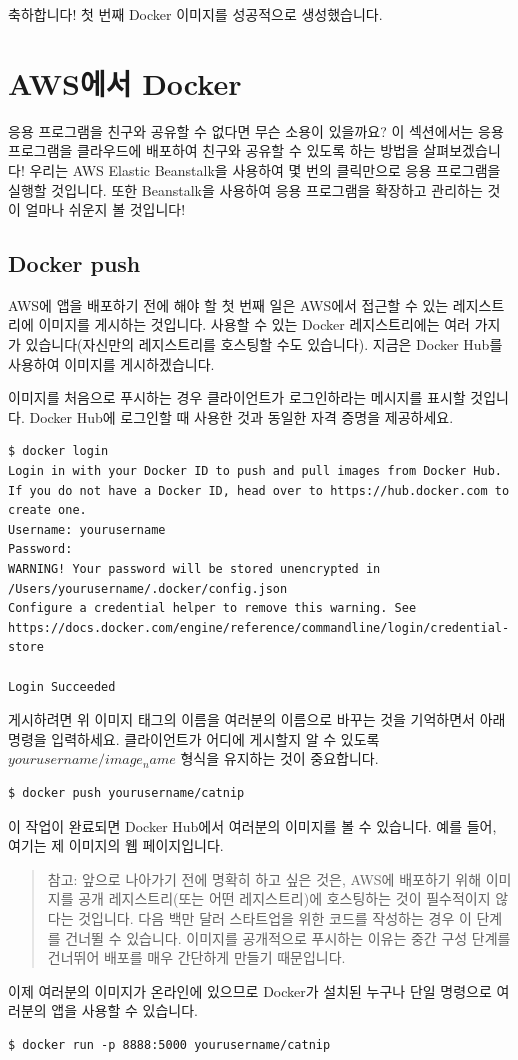 축하합니다! 첫 번째 Docker 이미지를 성공적으로 생성했습니다.

\section{AWS에서 Docker}
응용 프로그램을 친구와 공유할 수 없다면 무슨 소용이 있을까요? 이 섹션에서는 응용 프로그램을 클라우드에 배포하여 친구와 공유할 수 있도록 하는 방법을 살펴보겠습니다! 우리는 AWS Elastic Beanstalk을 사용하여 몇 번의 클릭만으로 응용 프로그램을 실행할 것입니다. 또한 Beanstalk을 사용하여 응용 프로그램을 확장하고 관리하는 것이 얼마나 쉬운지 볼 것입니다!

\subsection{Docker push}
AWS에 앱을 배포하기 전에 해야 할 첫 번째 일은 AWS에서 접근할 수 있는 레지스트리에 이미지를 게시하는 것입니다. 사용할 수 있는 Docker 레지스트리에는 여러 가지가 있습니다(자신만의 레지스트리를 호스팅할 수도 있습니다). 지금은 Docker Hub를 사용하여 이미지를 게시하겠습니다.

이미지를 처음으로 푸시하는 경우 클라이언트가 로그인하라는 메시지를 표시할 것입니다. Docker Hub에 로그인할 때 사용한 것과 동일한 자격 증명을 제공하세요.
\begin{lstlisting}[language=Shell]
$ docker login
Login in with your Docker ID to push and pull images from Docker Hub. If you do not have a Docker ID, head over to https://hub.docker.com to create one.
Username: yourusername
Password:
WARNING! Your password will be stored unencrypted in /Users/yourusername/.docker/config.json
Configure a credential helper to remove this warning. See https://docs.docker.com/engine/reference/commandline/login/credential-store

Login Succeeded
\end{lstlisting}

게시하려면 위 이미지 태그의 이름을 여러분의 이름으로 바꾸는 것을 기억하면서 아래 명령을 입력하세요. 클라이언트가 어디에 게시할지 알 수 있도록 $yourusername/image_name$ 형식을 유지하는 것이 중요합니다.
\begin{lstlisting}[language=Shell]
$ docker push yourusername/catnip
\end{lstlisting}

이 작업이 완료되면 Docker Hub에서 여러분의 이미지를 볼 수 있습니다. 예를 들어, 여기는 제 이미지의 웹 페이지입니다.
\begin{quote}
참고: 앞으로 나아가기 전에 명확히 하고 싶은 것은, AWS에 배포하기 위해 이미지를 공개 레지스트리(또는 어떤 레지스트리)에 호스팅하는 것이 필수적이지 않다는 것입니다. 다음 백만 달러 스타트업을 위한 코드를 작성하는 경우 이 단계를 건너뛸 수 있습니다. 이미지를 공개적으로 푸시하는 이유는 중간 구성 단계를 건너뛰어 배포를 매우 간단하게 만들기 때문입니다.
\end{quote}
이제 여러분의 이미지가 온라인에 있으므로 Docker가 설치된 누구나 단일 명령으로 여러분의 앱을 사용할 수 있습니다.
\begin{lstlisting}[language=Shell]
$ docker run -p 8888:5000 yourusername/catnip
\end{lstlisting}

